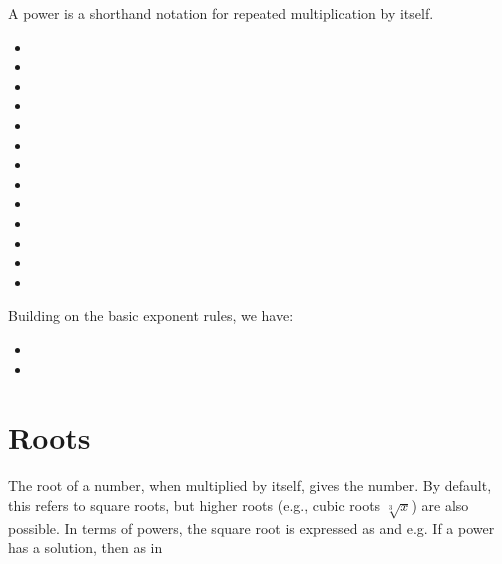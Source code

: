 A power is a shorthand notation for repeated multiplication by itself.

\begin{itemize}
    \item {}
    \item {}
    \item {}
    \item {}
    \item {}
    \item {}
    \item {}
    \item {}
    \item {}
    \item {}
    \item {}
    \item {}
    \item {}
\end{itemize}

Building on the basic exponent rules, we have: \begin{itemize} \item {} \item {} \end{itemize}

\section{Roots}\label{Roots}

The root of a number, when multiplied by itself, gives the number. By default, this refers to square roots, but higher roots (e.g., cubic roots $\sqrt[3]{x}$) are also possible. In terms of powers, the square root is expressed as 
and 
e.g.
If a power has a solution, then 
as in 

